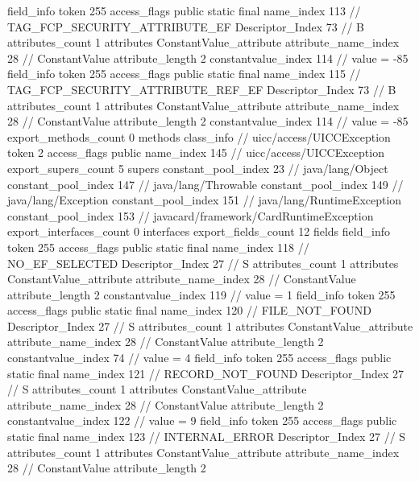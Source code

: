 {{{{{{{				}
				}
			}
			field_info {
				token	255
				access_flags	public static final
				name_index	113		// TAG_FCP_SECURITY_ATTRIBUTE_EF
				Descriptor_Index	73		// B
				attributes_count	1
				attributes {
				ConstantValue_attribute {
					attribute_name_index	28		// ConstantValue
					attribute_length	2
					constantvalue_index	114		// value = -85
				}
				}
			}
			field_info {
				token	255
				access_flags	public static final
				name_index	115		// TAG_FCP_SECURITY_ATTRIBUTE_REF_EF
				Descriptor_Index	73		// B
				attributes_count	1
				attributes {
				ConstantValue_attribute {
					attribute_name_index	28		// ConstantValue
					attribute_length	2
					constantvalue_index	114		// value = -85
				}
				}
			}
			}
			export_methods_count	0
			methods {
			}
		}
		class_info {		// uicc/access/UICCException
			token	2
			access_flags	public
			name_index	145		// uicc/access/UICCException
			export_supers_count	5
			supers {
				constant_pool_index	23		// java/lang/Object
				constant_pool_index	147		// java/lang/Throwable
				constant_pool_index	149		// java/lang/Exception
				constant_pool_index	151		// java/lang/RuntimeException
				constant_pool_index	153		// javacard/framework/CardRuntimeException
			}
			export_interfaces_count	0
			interfaces {
			}
			export_fields_count	12
			fields {
			field_info {
				token	255
				access_flags	public static final
				name_index	118		// NO_EF_SELECTED
				Descriptor_Index	27		// S
				attributes_count	1
				attributes {
				ConstantValue_attribute {
					attribute_name_index	28		// ConstantValue
					attribute_length	2
					constantvalue_index	119		// value = 1
				}
				}
			}
			field_info {
				token	255
				access_flags	public static final
				name_index	120		// FILE_NOT_FOUND
				Descriptor_Index	27		// S
				attributes_count	1
				attributes {
				ConstantValue_attribute {
					attribute_name_index	28		// ConstantValue
					attribute_length	2
					constantvalue_index	74		// value = 4
				}
				}
			}
			field_info {
				token	255
				access_flags	public static final
				name_index	121		// RECORD_NOT_FOUND
				Descriptor_Index	27		// S
				attributes_count	1
				attributes {
				ConstantValue_attribute {
					attribute_name_index	28		// ConstantValue
					attribute_length	2
					constantvalue_index	122		// value = 9
				}
				}
			}
			field_info {
				token	255
				access_flags	public static final
				name_index	123		// INTERNAL_ERROR
				Descriptor_Index	27		// S
				attributes_count	1
				attributes {
				ConstantValue_attribute {
					attribute_name_index	28		// ConstantValue
					attribute_length	2
}}}}}}}
